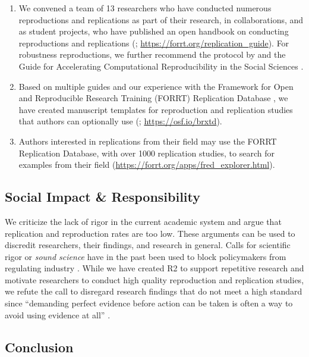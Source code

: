 \documentclass[11pt,a4paper]{article}
\providecommand{\tightlist}{\setlength{\itemsep}{0pt}\setlength{\parskip}{0pt}}
\begin{document}
\begin{enumerate}
\def\labelenumi{\arabic{enumi}.}
\tightlist
\item
  We convened a team of 13 researchers who have conducted numerous
  reproductions and replications as part of their research, in
  collaborations, and as student projects, who have published an open
  handbook on conducting reproductions and replications
  (\autocite{Roseler2025HandbookReplication};
  \url{https://forrt.org/replication_guide}). For robustness
  reproductions, we further recommend the protocol by
  \textcite{AnkelPeters2025StructuredRobustness} and the Guide for
  Accelerating Computational Reproducibility in the Social Sciences
  \autocite{BITSS2020ACRE}.
\item
  Based on multiple guides and our experience with the Framework for
  Open and Reproducible Research Training (FORRT) Replication Database
  \autocite{roseler2024replicationdatabase}, we have created manuscript
  templates for reproduction and replication studies that authors can
  optionally use (\autocite{Roseler2025aStaRT};
  \url{https://osf.io/brxtd}).
\item
  Authors interested in replications from their field may use the FORRT
  Replication Database, with over 1000 replication studies, to search
  for examples from their field
  (\url{https://forrt.org/apps/fred_explorer.html}).
\end{enumerate}

\subsection{Social Impact \&
Responsibility}\label{social-impact-responsibility}

We criticize the lack of rigor in the current academic system and argue
that replication and reproduction rates are too low. These arguments can
be used to discredit researchers, their findings, and research in
general. Calls for scientific rigor or \emph{sound science} have in the
past been used to block policymakers from regulating industry
\autocite{baba2005legislating}. While we have created R2 to support
repetitive research and motivate researchers to conduct high quality
reproduction and replication studies, we refute the call to disregard
research findings that do not meet a high standard since ``demanding
perfect evidence before action can be taken is often a way to avoid
using evidence at all'' \autocite{COS2025RestoringGoldStandardScience}.

\subsection{Conclusion}\label{conclusion}
\end{document}
